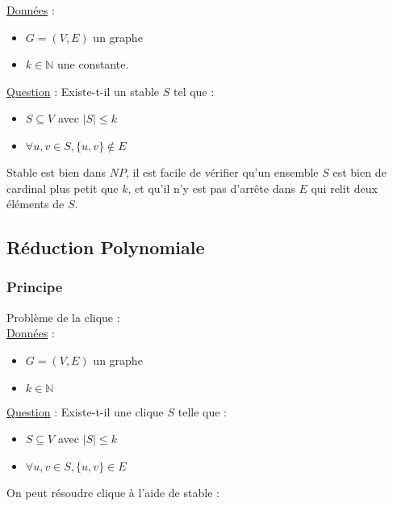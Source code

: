 \documentclass{article}
\theoremstyle{plain}
\begin{document}
      \underline{Données} :
      \begin{itemize}
        \item $G = (V, E)$ un graphe
        \item $k \in \mathbb N$ une constante.
      \end{itemize}
      \underline{Question} : Existe-t-il un stable $S$ tel que :
      \begin{itemize}
        \item $S \subseteq V$ avec $|S| \leq k$
        \item $\forall u, v \in S, \{u, v\} \not \in E$
      \end{itemize}

      Stable est bien dans $NP$, il est facile de vérifier qu'un ensemble $S$
      est bien de cardinal plus petit que $k$, et qu'il n'y est pas d'arrête
      dans $E$ qui relit deux éléments de $S$.

    \subsection{Réduction Polynomiale}

      \subsubsection{Principe}

      Problème de la clique : \\
      \underline{Données} :
      \begin{itemize}
        \item $G = (V, E)$ un graphe
        \item $k \in \mathbb N$
      \end{itemize}
      \underline{Question} : Existe-t-il une clique $S$ telle que :
      \begin{itemize}
        \item $S \subseteq V$ avec $|S| \leq k$
        \item $\forall u, v \in S, \{u, v\} \in E$
      \end{itemize}

      On peut résoudre clique à l'aide de stable :
\end{document}
